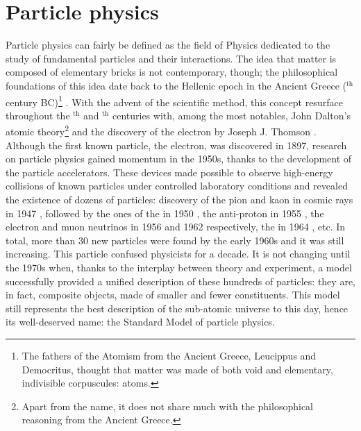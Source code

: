 
\chapter{Particle physics}
\label{chap:ParticlePhysics}

Particle physics can fairly be defined as the field of Physics dedicated to the study of fundamental particles and their interactions. The idea that matter is composed of elementary bricks is not contemporary, though; the philosophical foundations of this idea date back to the Hellenic epoch in the Ancient Greece ($^{\text{th}}$ century BC)\footnote{The fathers of the Atomism from the Ancient Greece, Leucippus and Democritus, thought that matter was made of both void and elementary, indivisible corpuscules: atoms.} \cite{pullmanAtomHistoryHuman1998}. With the advent of the scientific method, this concept resurface throughout the $^{\text{th}}$ and $^{\text{th}}$ centuries with, among the most notables, John Dalton's atomic theory\footnote{Apart from the name, it does not share much with the philosophical reasoning from the Ancient Greece.} and the discovery of the electron by Joseph J. Thomson \cite{thomsonXLCathodeRays1897}. Although the first known particle, the electron, was discovered in 1897, research on particle physics gained momentum in the 1950s, thanks to the development of the particle accelerators. These devices made possible to observe high-energy collisions of known particles under controlled laboratory conditions and revealed the existence of dozens of particles: discovery of the pion \cite{lattesProcessesInvolvingCharged1947} and kaon in cosmic rays in 1947 \cite{rochesterdr.EvidenceExistenceNew1947}, followed by the ones of the \rmLambda in 1950 \cite{hopperEvidenceConcerningExistence1950}, the anti-proton in 1955 \cite{chamberlainObservationAntiprotons1955}, the electron and muon neutrinos in 1956 \cite{reinesNeutrino1956} and 1962 \cite{danbyObservationHighEnergyNeutrino1962} respectively, the \rmOmega in 1964 \cite{barnesObservationHyperonStrangeness1964a}, etc. In total, more than 30 new particles were found by the early 1960s \cite{serwayModernPhysics2004} and it was still increasing. This particle  confused physicists for a decade. It is not changing until the 1970s when, thanks to the interplay between theory and experiment, a model successfully provided a unified description of these hundreds of particles: they are, in fact, composite objects, made of smaller and fewer constituents. This model still represents the best description of the sub-atomic universe to this day, hence its well-deserved name: the Standard Model of particle physics. \\

